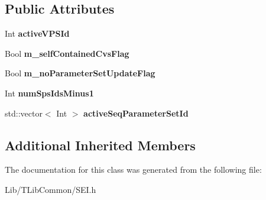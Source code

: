 \subsection*{Public Attributes}
\begin{DoxyCompactItemize}
\item 
\mbox{\label{class_s_e_i_active_parameter_sets_ac3b59a2fefa471c1eab9a86a21d09b25}} 
Int {\bfseries active\+V\+P\+S\+Id}
\item 
\mbox{\label{class_s_e_i_active_parameter_sets_a592a8f15c395bb53be908473959a4ec4}} 
Bool {\bfseries m\+\_\+self\+Contained\+Cvs\+Flag}
\item 
\mbox{\label{class_s_e_i_active_parameter_sets_ad35c033d57738ac4eea40ba75551582f}} 
Bool {\bfseries m\+\_\+no\+Parameter\+Set\+Update\+Flag}
\item 
\mbox{\label{class_s_e_i_active_parameter_sets_a3e19626b749c69e1147284ab6adffa33}} 
Int {\bfseries num\+Sps\+Ids\+Minus1}
\item 
\mbox{\label{class_s_e_i_active_parameter_sets_a2059e7b53d65462ae6c1f730f40dcc07}} 
std\+::vector$<$ Int $>$ {\bfseries active\+Seq\+Parameter\+Set\+Id}
\end{DoxyCompactItemize}
\subsection*{Additional Inherited Members}


The documentation for this class was generated from the following file\+:\begin{DoxyCompactItemize}
\item 
Lib/\+T\+Lib\+Common/S\+E\+I.\+h\end{DoxyCompactItemize}
